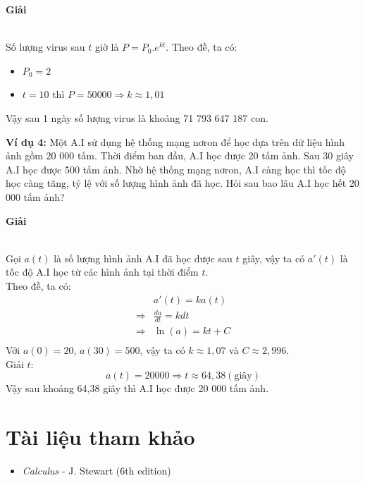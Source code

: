 \documentclass[13pt]{article}
\begin{document}
\centerline{\textbf{Giải}}\\
Số lượng virus sau $t$ giờ là $P=P_0.e^{kt}$. Theo đề, ta có:
\begin{itemize}
    \item $P_0=2$
    \item $t=10$ thì $P=50 000\Rightarrow k\approx1,01$
\end{itemize}
Vậy sau 1 ngày số lượng virus là khoảng 71 793 647 187 con.\\
\par\textbf{Ví dụ 4:} Một A.I sử dụng hệ thống mạng nơron để học dựa trên dữ liệu hình ảnh gồm 20 000 tấm. Thời điểm ban đầu, A.I học được 20 tấm ảnh. Sau 30 giây A.I học được 500 tấm ảnh. Nhờ hệ thống mạng nơron, A.I càng học thì tốc độ học càng tăng, tỷ lệ với số lượng hình ảnh đã học. Hỏi sau bao lâu A.I học hết 20 000 tấm ảnh?
\centerline{\textbf{Giải}}\\
Gọi $a(t)$ là số lượng hình ảnh A.I đã học được sau $t$ giây, vậy ta có $a'(t)$ là tốc độ A.I học từ các hình ảnh tại thời điểm $t$.\\Theo đề, ta có: \begin{align*}
&a'(t)=ka(t)\\
\Rightarrow &\frac{da}{dt}=kdt\\
\Rightarrow &\ln(a)=kt+C\\
\end{align*}
Với $a(0)=20$, $a(30)=500$, vậy ta có $k\approx1,07$ và $C\approx2,996$.\\Giải $t$: $$a(t)=20000\Rightarrow t\approx64,38(\text{giây})$$
Vậy sau khoảng 64,38 giây thì A.I học được 20 000 tấm ảnh.
\section{Tài liệu tham khảo}
\begin{itemize}
    \item \textit{Calculus} - J. Stewart (6th edition)
\end{itemize}
\end{document}
